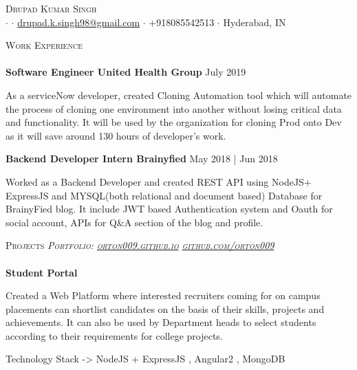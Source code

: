 \documentclass[a4paper]{article}
\newcommand{\lineunder} {
    \vspace*{-8pt} \\
    \hspace*{-18pt} \hrulefill \\
}
\newcommand{\header} [1] {
    {\hspace*{-18pt}\vspace*{6pt} \textsc{#1}}
    \vspace*{-6pt} \lineunder
}
\begin{document}
\vspace*{-10mm}

\begin{center}
	{\Huge \scshape {Drupad Kumar Singh}}\\
	\href{https://www.linkedin.com/in/drupad-singh-14337712b/}{\faLinkedin}
	$\cdot$
	\href{https://github.com/orton009}{\faGithub}
	$\cdot$
	\href{mailto:drupad.k.singh98@gmail.com}{drupad.k.singh98@gmail.com} $\cdot$ +918085542513 $\cdot$ Hyderabad, IN \\
\end{center}
\vspace*{1mm}
\header{Work Experience}
\textbf{Software Engineer  \hfill United Health Group} \hfill July 2019\\
\vspace{-1mm}
\begin{itemize} \itemsep 1pt
	\small{\item As a serviceNow developer, created Cloning Automation tool which will automate the process of cloning one environment into another without losing critical data and functionality. It will be used by the organization for cloning Prod onto Dev as it will save around 130 hours of developer's work.}
\end{itemize}
\vspace{0mm}

\textbf{Backend Developer Intern  \hfill Brainyfied} \hfill May 2018 | Jun 2018\\
\vspace{-1mm}
\begin{itemize} \itemsep 1pt
	\small{\item Worked as a Backend Developer and created REST API using NodeJS+ ExpressJS and MYSQL(both relational and document based) Database for BrainyFied blog. It include JWT based Authentication system and Oauth for social account, APIs for Q&A section of the blog and profile.
	}
\end{itemize}
\vspace{0mm}

\header{Projects \hfill \sl \small{Portfolio: \href{http://orton009.github.io}{orton009.github.io}} \hfill \faGithub \sl \small{ \href{https://github.com/orton009}{github.com/orton009}}}

\textbf{Student Portal
\href{https://github.com/orton009}{\faGithub}}
\vspace{-1mm}
\begin{itemize}
	\small{\item Created a Web Platform where interested recruiters coming for on campus placements can shortlist candidates on the basis of their skills, projects and achievements. It can also be used by Department heads to select students according to their requirements for college projects.  }
	\small{\item Technology Stack -> NodeJS + ExpressJS , Angular2 , MongoDB  }
	\vspace{-1mm}
\end{itemize}
\end{document}

